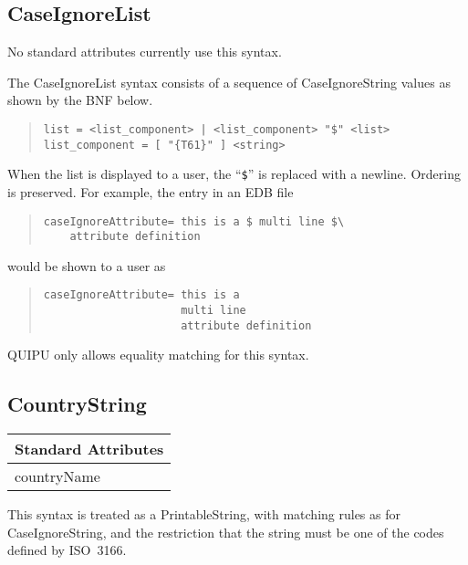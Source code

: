 \subsection{CaseIgnoreList}

No standard attributes currently use this syntax.
 
The CaseIgnoreList syntax consists of a sequence of CaseIgnoreString
values as shown by the BNF below.
\begin{quote}\begin{verbatim}
list = <list_component> | <list_component> "$" <list>
list_component = [ "{T61}" ] <string>
\end{verbatim}\end{quote}
When the list is displayed to a user, the ``\verb+$+'' is replaced
with a newline.  Ordering is preserved.  For example, the entry in an
EDB file
\begin{quote}\begin{verbatim}
caseIgnoreAttribute= this is a $ multi line $\
	attribute definition
\end{verbatim}\end{quote}
would be shown to a user as
\begin{quote}\begin{verbatim}
caseIgnoreAttribute= this is a 
                     multi line
                     attribute definition
\end{verbatim}\end{quote}

QUIPU only allows equality matching for this syntax.

\subsection{CountryString}
\begin{center}\small
\begin{tabular}{|l|}\hline
Standard Attributes \\ \hline
	countryName\\
\hline
\end{tabular}
\end{center}
This syntax is treated as a PrintableString, with matching rules as for
CaseIgnoreString, and the restriction that the string must 
be one of the codes defined by ISO~3166.




